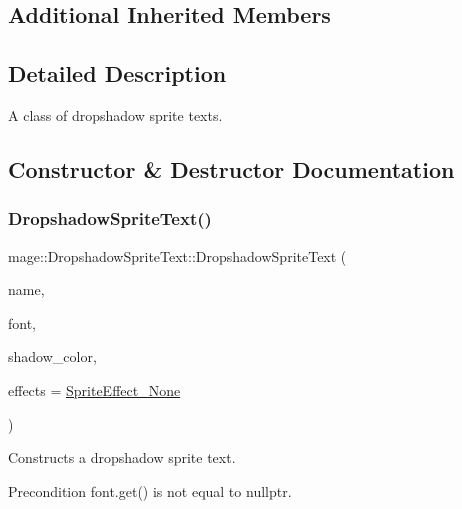 \subsection*{Additional Inherited Members}


\subsection{Detailed Description}
A class of dropshadow sprite texts. 

\subsection{Constructor \& Destructor Documentation}
\hypertarget{classmage_1_1_dropshadow_sprite_text_a10b134e06d6bcf04168005630a2934f0}{}\label{classmage_1_1_dropshadow_sprite_text_a10b134e06d6bcf04168005630a2934f0} 
\subsubsection{\texorpdfstring{Dropshadow\+Sprite\+Text()}{DropshadowSpriteText()}\hspace{0.1cm}{\footnotesize\ttfamily [1/4]}}
{\footnotesize\ttfamily mage\+::\+Dropshadow\+Sprite\+Text\+::\+Dropshadow\+Sprite\+Text (\begin{DoxyParamCaption}\item[{const string \&}]{name,  }\item[{\hyperlink{namespacemage_a1e01ae66713838a7a67d30e44c67703e}{Shared\+Ptr}$<$ \hyperlink{classmage_1_1_sprite_font}{Sprite\+Font} $>$}]{font,  }\item[{const \hyperlink{structmage_1_1_color}{Color} \&}]{shadow\+\_\+color,  }\item[{\hyperlink{namespacemage_a9cfe18123066ba4236f548f9de75d881}{Sprite\+Effect}}]{effects = {\ttfamily \hyperlink{namespacemage_a9cfe18123066ba4236f548f9de75d881af3c275fbfacfe174da928b2f24dfa515}{Sprite\+Effect\+\_\+\+None}} }\end{DoxyParamCaption})\hspace{0.3cm}{\ttfamily [explicit]}}

Constructs a dropshadow sprite text.

\begin{DoxyPrecond}{Precondition}
{\ttfamily font.\+get()} is not equal to {\ttfamily nullptr}. 
\end{DoxyPrecond}

